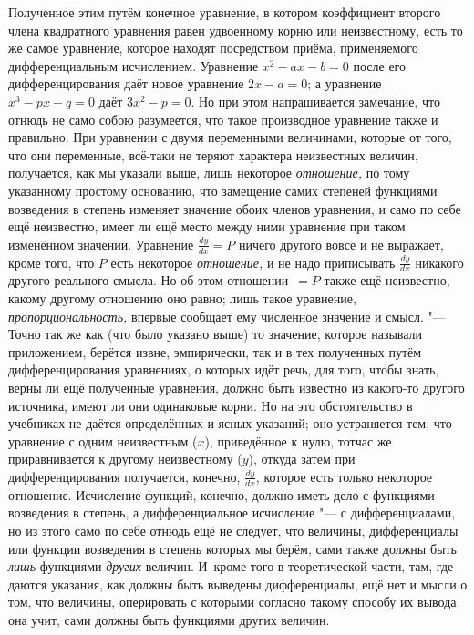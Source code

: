 Полученное этим путём конечное уравнение, в котором коэффициент второго члена
квадратного уравнения равен удвоенному корню или неизвестному, есть то же самое
уравнение, которое находят посредством приёма, применяемого дифференциальным
исчислением. Уравнение $x^2-ax-b=0$ после его дифференцирования даёт новое
уравнение $2x-a=0$; а уравнение $x^3-px-q=0$ даёт $3x^2-p=0$. Но при этом
напрашивается замечание, что отнюдь не само собою разумеется, что такое
производное уравнение также и правильно. При уравнении с двумя переменными
величинами, которые от того, что они переменные, всё-таки не теряют характера
неизвестных величин, получается, как мы указали выше, лишь некоторое
{\em отношение,} по тому указанному простому основанию, что замещение самих
степеней функциями возведения в степень изменяет значение обоих членов
уравнения, и само по себе ещё неизвестно, имеет ли ещё место между ними
уравнение при таком изменённом значении. Уравнение $\frac{dy}{dx}=P$ ничего
другого вовсе и не выражает, кроме того, что $P$ есть некоторое
{\em отношение,} и не надо приписывать $\frac{dy}{dx}$ никакого другого
реального смысла. Но об этом отношении~$=P$ также ещё неизвестно, какому
другому отношению оно равно; лишь такое уравнение, {\em пропорциональность,}
впервые сообщает ему численное значение и смысл. "--- Точно так же как (что
было указано выше) то значение, которое называли приложением, берётся извне,
эмпирически, так и в тех полученных путём дифференцирования уравнениях, о
которых идёт речь, для того, чтобы знать, верны ли ещё полученные уравнения,
должно быть известно из какого-то другого источника, имеют ли они одинаковые
корни. Но на это обстоятельство в учебниках не даётся определённых и ясных
указаний; оно устраняется тем, что уравнение с одним неизвестным ($x$),
приведённое к нулю, тотчас же приравнивается к другому неизвестному ($y$),
откуда затем при дифференцирования получается, конечно, $\frac{dy}{dx}$,
которое есть только некоторое отношение. Исчисление функций, конечно, должно
иметь дело с функциями возведения в степень, а дифференциальное исчисление "--- с
дифференциалами, но из этого само по себе отнюдь ещё не следует, что величины,
дифференциалы или функции возведения в степень которых мы берём, сами также
должны быть {\em лишь} функциями {\em других} величин. И~кроме того в
теоретической части, там, где даются указания, как должны быть выведены
дифференциалы, ещё нет и мысли о том, что величины, оперировать с которыми
согласно такому способу их вывода она учит, сами должны быть функциями других
величин.

